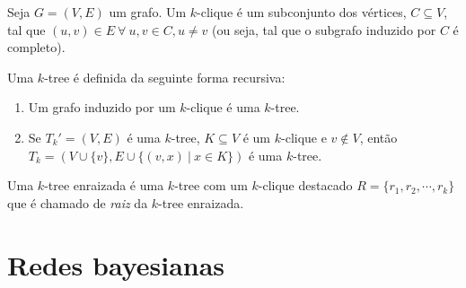 \begin{definition}[$k$-clique]
  \label{def:kclique}
  \cite{defkclique} Seja $G = (V, E)$ um grafo. Um $k$-clique é um subconjunto dos vértices, $C \subseteq V$, tal que $(u, v) \in E \ \forall \ u, v \in C, u \neq v$ (ou seja, tal que o subgrafo induzido por $C$ é completo).
\end{definition}

\begin{definition}
  \label{def:ktree}
  \cite{harary} Uma $k$-tree é definida da seguinte forma recursiva:

  \begin{enumerate}
    \item Um grafo induzido por um $k$-clique é uma $k$-tree.
    \item Se $T_k' = (V, E)$ é uma $k$-tree, $K \subseteq V$ é um $k$-clique e $v \not \in V$, então $T_k = (V \cup \{v\}, E \cup \{(v,x) \ | \  x \in K\})$ é uma $k$-tree.
  \end{enumerate}

  Uma $k$-tree enraizada é uma $k$-tree com um $k$-clique destacado $R = \{r_1, r_2, \cdots, r_k\}$ que é chamado de \emph{raiz} da $k$-tree enraizada.
\end{definition}

\section{Redes bayesianas}

